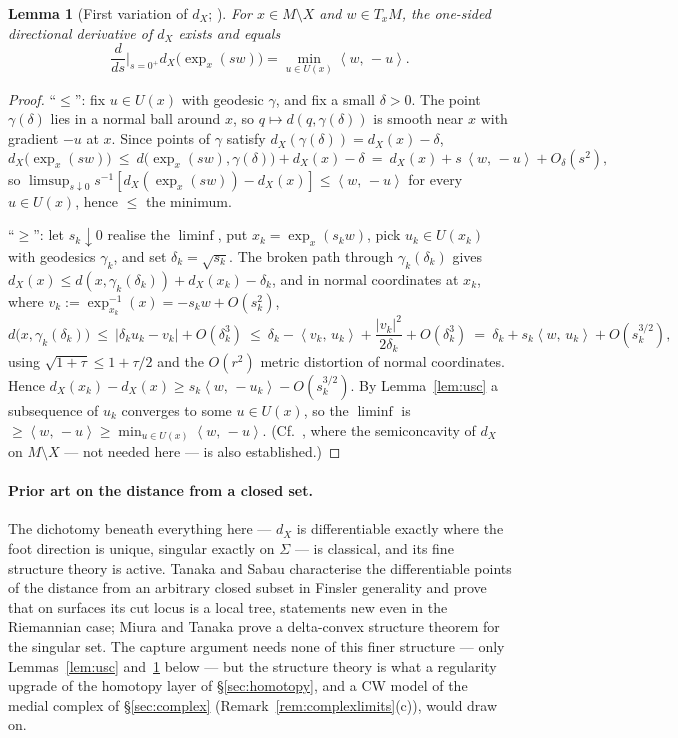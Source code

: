 \documentclass[11pt]{article}
\newtheorem{lemma}[theorem]{Lemma}
\theoremstyle{remark}
\newcommand{\X}{X}
\newcommand{\dX}{d_{\X}}
\newcommand{\sca}[2]{\left\langle #1,\, #2\right\rangle}
\begin{document}
\begin{lemma}[First variation of $\dX$; {\cite[\S3]{MM}}]
\label{lem:firstvar}
For $x\in M\setminus\X$ and $w\in T_{x}M$, the one-sided directional
derivative of $\dX$ exists and equals
\[
  \frac{d}{ds}\Big|_{s=0^{+}}\dX\bigl(\exp_{x}(sw)\bigr)
  =\min_{u\in U(x)}\sca{w}{-u}.
\]
\end{lemma}

\begin{proof}
``$\le$'': fix $u\in U(x)$ with geodesic $\gamma$, and fix a small
$\delta>0$. The point $\gamma(\delta)$ lies in a normal ball around
$x$, so $q\mapsto d(q,\gamma(\delta))$ is smooth near $x$ with
gradient $-u$ at $x$. Since points of $\gamma$ satisfy
$\dX(\gamma(\delta))=\dX(x)-\delta$,
\[
  \dX\bigl(\exp_{x}(sw)\bigr)
  \ \le\ d\bigl(\exp_{x}(sw),\gamma(\delta)\bigr)+\dX(x)-\delta
  \ =\ \dX(x)+s\,\sca{w}{-u}+O_{\delta}(s^{2}),
\]
so $\limsup_{s\downarrow0}s^{-1}[\dX(\exp_{x}(sw))-\dX(x)]\le
\sca{w}{-u}$ for every $u\in U(x)$, hence $\le$ the minimum.

``$\ge$'': let $s_{k}\downarrow0$ realise the $\liminf$, put
$x_{k}=\exp_{x}(s_{k}w)$, pick $u_{k}\in U(x_{k})$ with geodesics
$\gamma_{k}$, and set $\delta_{k}=\sqrt{s_{k}}$. The broken path
through $\gamma_{k}(\delta_{k})$ gives
$\dX(x)\le d(x,\gamma_{k}(\delta_{k}))+\dX(x_{k})-\delta_{k}$, and in
normal coordinates at $x_{k}$, where
$v_{k}:=\exp_{x_{k}}^{-1}(x)=-s_{k}w+O(s_{k}^{2})$,
\[
  d\bigl(x,\gamma_{k}(\delta_{k})\bigr)
  \ \le\ |\delta_{k}u_{k}-v_{k}|+O(\delta_{k}^{3})
  \ \le\ \delta_{k}-\sca{v_{k}}{u_{k}}+\frac{|v_{k}|^{2}}{2\delta_{k}}
  +O(\delta_{k}^{3})
  \ =\ \delta_{k}+s_{k}\sca{w}{u_{k}}+O(s_{k}^{3/2}),
\]
using $\sqrt{1+\tau}\le1+\tau/2$ and the $O(r^{2})$ metric distortion
of normal coordinates. Hence
$\dX(x_{k})-\dX(x)\ge s_{k}\sca{w}{-u_{k}}-O(s_{k}^{3/2})$. By
Lemma~\ref{lem:usc} a subsequence of $u_{k}$ converges to some
$u\in U(x)$, so the $\liminf$ is $\ge\sca{w}{-u}\ge\min_{u\in U(x)}
\sca{w}{-u}$. (Cf.\ \cite[\S3]{MM}, where the semiconcavity of $\dX$
on $M\setminus\X$ --- not needed here --- is also established.)
\end{proof}

\paragraph{Prior art on the distance from a closed set.} The
dichotomy beneath everything here --- $\dX$ is differentiable
exactly where the foot direction is unique, singular exactly on
$\Sigma$ --- is classical, and its fine structure theory is active.
Tanaka and Sabau \cite{TS} characterise the differentiable points
of the distance from an arbitrary closed subset in Finsler
generality and prove that on surfaces its cut locus is a local
tree, statements new even in the Riemannian case; Miura and Tanaka
\cite{MT} prove a delta-convex structure theorem for the singular
set. The capture argument needs none of this finer structure ---
only Lemmas~\ref{lem:usc} and~\ref{lem:firstvar} below --- but the
structure theory is what a regularity upgrade of the homotopy layer
of \S\ref{sec:homotopy}, and a CW model of the medial complex of
\S\ref{sec:complex} (Remark~\ref{rem:complexlimits}(c)), would draw
on.
\end{document}
